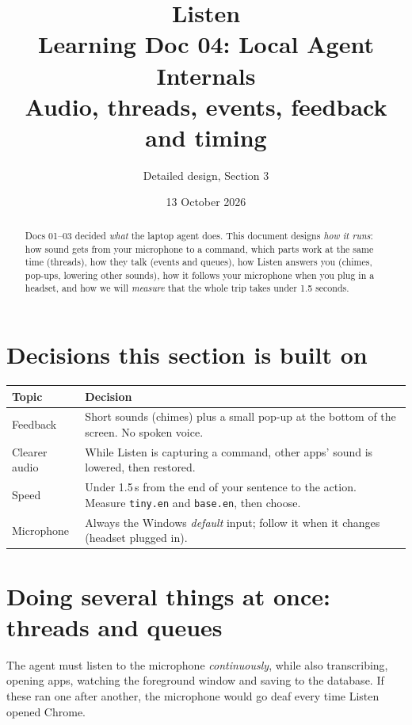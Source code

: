 \documentclass[11pt,a4paper]{article}
\title{\textbf{Listen}\\[4pt]\large Learning Doc 04: Local Agent Internals\\
       \normalsize Audio, threads, events, feedback and timing}
\author{Detailed design, Section 3}
\date{13 October 2026}
\begin{document}
\maketitle

\begin{abstract}
\noindent Docs 01--03 decided \emph{what} the laptop agent does. This document designs
\emph{how it runs}: how sound gets from your microphone to a command, which parts work at the
same time (threads), how they talk (events and queues), how Listen answers you (chimes,
pop-ups, lowering other sounds), how it follows your microphone when you plug in a headset,
and how we will \emph{measure} that the whole trip takes under 1.5 seconds.
\end{abstract}

\tableofcontents
\newpage

\section{Decisions this section is built on}
\begin{center}
\renewcommand{\arraystretch}{1.2}
\begin{tabularx}{\textwidth}{l X}
\toprule
\textbf{Topic} & \textbf{Decision} \\
\midrule
Feedback      & Short sounds (chimes) plus a small pop-up at the bottom of the screen. No spoken voice. \\
Clearer audio & While Listen is capturing a command, other apps' sound is lowered, then restored. \\
Speed         & Under 1.5\,s from the end of your sentence to the action. Measure \texttt{tiny.en} and \texttt{base.en}, then choose. \\
Microphone    & Always the Windows \emph{default} input; follow it when it changes (headset plugged in). \\
\bottomrule
\end{tabularx}
\end{center}

\section{Doing several things at once: threads and queues}

The agent must listen to the microphone \emph{continuously}, while also transcribing, opening
apps, watching the foreground window and saving to the database. If these ran one after
another, the microphone would go deaf every time Listen opened Chrome.
\end{document}

